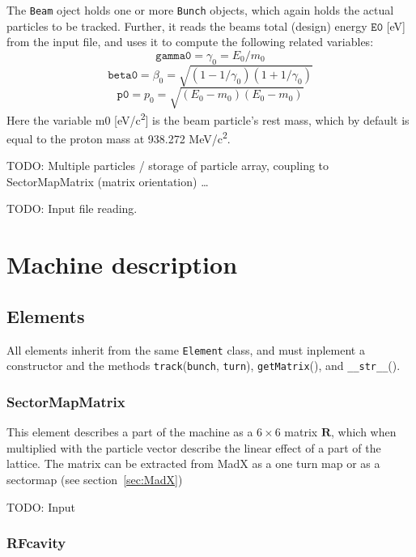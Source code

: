 \documentclass[a4paper]{report}
\begin{document}
The \texttt{Beam} oject holds one or more \texttt{Bunch} objects, which again holds the actual particles to be tracked. Further, it reads the beams total (design) energy $\mathtt{E0}$ [eV] from the input file, and uses it to compute the following related variables:
\begin{equation}
  \mathtt{gamma0} = \gamma_0 = E_0/m_0
\end{equation}
\begin{equation}
  \mathtt{beta0} = \beta_0 = \sqrt{\left(1-1/\gamma_0\right) \left(1+1/\gamma_0\right)}
\end{equation}
\begin{equation}
  \mathtt{p0} = p_0 = \sqrt{\left(E_0-m_0\right) \left(E_0-m_0\right)}
  \label{eq:designmomentum}
\end{equation}
Here the variable m0 [eV/c\textsuperscript{2}] is the beam particle's rest mass, which by default is equal to the proton mass at 938.272 MeV/c\textsuperscript{2}.

TODO: Multiple particles / storage of particle array, coupling to SectorMapMatrix (matrix orientation) \ldots

TODO: Input file reading.

\chapter{Machine description}
\label{sec:machine}



\section{Elements}
All elements inherit from the same \texttt{Element} class, and must inplement a constructor and the methods \texttt{track}(\texttt{bunch}, \texttt{turn}), \texttt{getMatrix}(), and \texttt{\_\_str\_\_}().

\subsection{SectorMapMatrix}
This element describes a part of the machine as a $6 \times 6$ matrix $\mathbf{R}$, which when multiplied with the particle vector describe the linear effect of a part of the lattice.
The matrix can be extracted from MadX as a one turn map or as a sectormap (see section~\ref{sec:MadX})

TODO: Input

\subsection{RFcavity}
\end{document}
